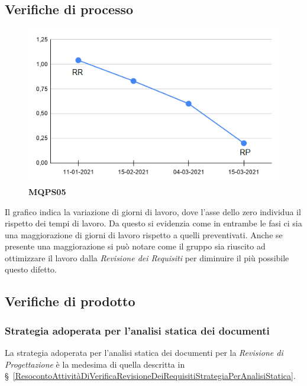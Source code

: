 {{\subsection{Verifiche di processo} \label{RevisioneDiProgettazioneVerificheDiProcesso}
\begin{center}
 \begin{figure}[H]
	 \includegraphics[width=1\linewidth]{../immagini/Metriche/MQPS05.png}
	 \caption{\textbf{MQPS05}}
 \end{figure}
\end{center}

Il grafico indica la variazione di giorni di lavoro, dove l'asse dello zero individua il rispetto dei tempi di lavoro. Da questo si evidenzia come in entrambe le fasi ci sia una maggiorazione di giorni di lavoro rispetto a quelli preventivati. Anche se presente una maggiorazione si può notare come il gruppo sia riuscito ad ottimizzare il lavoro dalla \textit{Revisione dei Requisiti} per diminuire il più possibile questo difetto.
 \subsection{Verifiche di prodotto} \label{ResocontoAttivitàDiVerificaRevisioneDiProgettazioneVerificheDiProdotto}
\subsubsection{Strategia adoperata per l’analisi statica dei documenti} \label{ResocontoAttivitàDiVerificaRevisioneDiProgettazioneVerificheDiProdottoStrategiaPerAnalisiStatica}
La strategia adoperata per l’analisi statica dei documenti per la \textit{Revisione di Progettazione} è la medesima di quella descritta in \S~\ref{ResocontoAttivitàDiVerificaRevisioneDeiRequisitiStrategiaPerAnalisiStatica}.
}}
